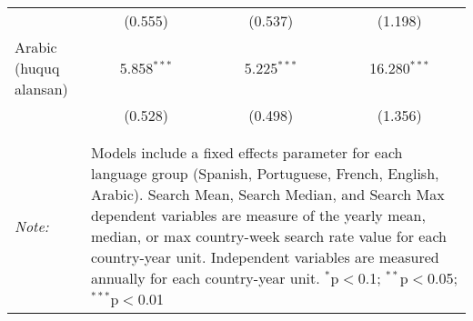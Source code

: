 \begin{table}[!htbp]
\begin{tabular}{@{\extracolsep{5pt}}lccc}
  & (0.555) & (0.537) & (1.198) \\ 
  Arabic (huquq alansan) & 5.858$^{***}$ & 5.225$^{***}$ & 16.280$^{***}$ \\ 
  & (0.528) & (0.498) & (1.356) \\ 
 \hline \\[-1.8ex] 
\hline 
\hline \\[-1.8ex] 
\textit{Note:}  & \multicolumn{3}{l}{\parbox[t]{8cm}{Models include a fixed effects parameter for each language group (Spanish, Portuguese, French, English, Arabic). Search Mean, Search Median, and Search Max dependent variables are measure of the yearly mean, median, or max country-week search rate value for each country-year unit. Independent variables are measured annually for each country-year unit. $^{*}$p$<$0.1; $^{**}$p$<$0.05; $^{***}$p$<$0.01}} \\ 
\end{tabular} 
\end{table} 
